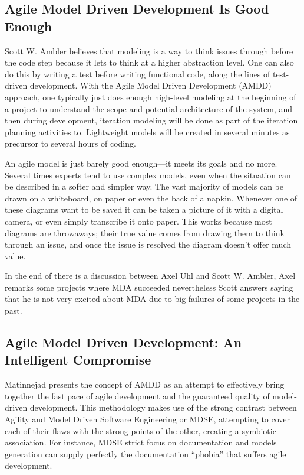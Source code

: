\documentclass[10pt, a4paper, twocolumn]{article}
\begin{document}
\subsection{Agile Model Driven Development Is Good Enough}

Scott W. Ambler \cite{2} believes that modeling is a way to think issues through before the code step because it lets to think at a higher abstraction level. One can also do this by writing a test before writing functional code, along the lines of test-driven development.
With the Agile Model Driven Development (AMDD) approach, one typically just does enough high-level modeling at the beginning of a project to understand the scope and potential architecture of the system, and then during development, iteration modeling will be done as part of the iteration planning activities to. Lightweight models will be created in several minutes as precursor to several hours of coding.

An agile model is just barely good enough—it meets its goals and no more. Several times experts tend to use complex models, even when the situation can be described in a softer and simpler way. The vast majority of models can be drawn on a whiteboard, on paper or even the back of a napkin. Whenever one of these diagrams want to be saved it can be taken a picture of it with a digital camera, or even simply transcribe it onto paper. This works because most diagrams are throwaways; their true value comes from drawing them to think through an issue, and once the issue is resolved the diagram doesn't offer much value.

In the end of \cite{2} there is a discussion between Axel Uhl and Scott W. Ambler, Axel remarks some projects where MDA succeeded nevertheless Scott answers saying that he is not very excited about MDA due to big failures of some projects in the past.

\subsection{Agile Model Driven Development: An Intelligent Compromise}

Matinnejad \cite{3} presents the concept of AMDD as an attempt to effectively bring together the fast pace of agile development and the guaranteed quality of model-driven development. This methodology makes use of the strong contrast between Agility and Model Driven Software Engineering or MDSE, attempting to cover each of their flaws with the strong points of the other, creating a symbiotic association. For instance, MDSE strict focus on documentation and models generation can supply perfectly the documentation “phobia” that suffers agile development.
\end{document}
